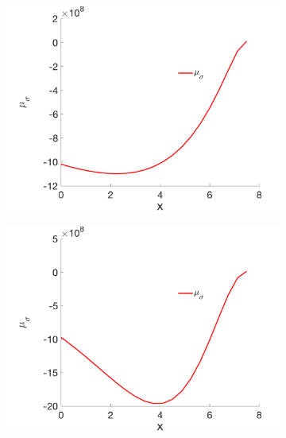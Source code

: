 \documentclass[a4paper]{article}
\begin{document}
\begin{figure} [H]
  \begin{subfigure}{0.45\textwidth}
    \centering
    \includegraphics[width=1.0\linewidth]{p1n20_mean.png}
    \label{fig:mean_p1}
  \end{subfigure}
  \begin{subfigure}{0.45\textwidth}
    \centering
    \includegraphics[width=1.0\linewidth]{p2n20_mean.png}
    \label{fig:mean_p2}
  \end{subfigure}\\[4ex]
  \begin{subfigure}{0.45\textwidth}
    \centering

\end{subfigure}
\end{figure}
\end{document}
